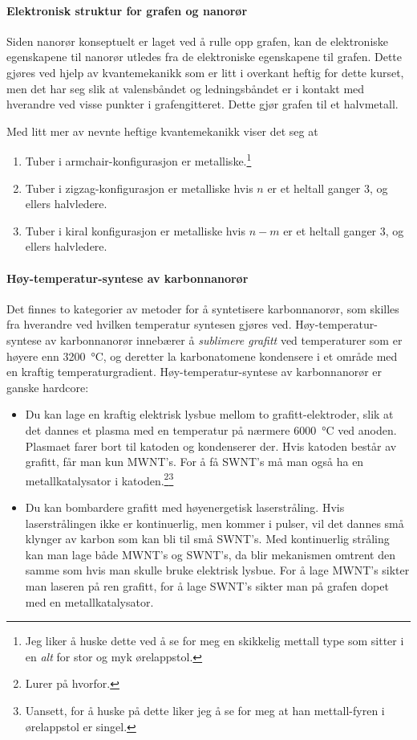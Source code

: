 
\paragraph{Elektronisk struktur for grafen og nanorør} Siden nanorør konseptuelt er laget ved å rulle opp grafen, kan de elektroniske egenskapene til nanorør utledes fra de elektroniske egenskapene til grafen. Dette gjøres ved hjelp av kvantemekanikk som er litt i overkant heftig for dette kurset, men det har seg slik at valensbåndet og ledningsbåndet er i kontakt med hverandre ved visse punkter i grafengitteret. Dette gjør grafen til et halvmetall.

Med litt mer av nevnte heftige kvantemekanikk viser det seg at
\begin{enumerate}
	\item Tuber i armchair-konfigurasjon er metalliske.\footnote{Jeg liker å huske dette ved å se for meg en skikkelig mettall type som sitter i en \emph{alt} for stor og myk ørelappstol.}
	\item Tuber i zigzag-konfigurasjon er metalliske hvis $n$ er et heltall ganger 3, og ellers halvledere.
	\item Tuber i kiral konfigurasjon er metalliske hvis $n-m$ er et heltall ganger 3, og ellers halvledere.
\end{enumerate}

\paragraph{Høy-temperatur-syntese av karbonnanorør} Det finnes to kategorier av metoder for å syntetisere karbonnanorør, som skilles fra hverandre ved hvilken temperatur syntesen gjøres ved. Høy-temperatur-syntese av karbonnanorør innebærer å \emph{sublimere grafitt} ved temperaturer som er høyere enn \SI{3200}{\celsius}, og deretter la karbonatomene kondensere i et område med en kraftig temperaturgradient. Høy-temperatur-syntese av karbonnanorør er ganske hardcore:
\begin{itemize}
	\item Du kan lage en kraftig elektrisk lysbue mellom to grafitt-elektroder, slik at det dannes et plasma med en temperatur på nærmere \SI{6000}{\celsius} ved anoden. Plasmaet farer bort til katoden og kondenserer der. Hvis katoden består av grafitt, får man kun MWNT's. For å få SWNT's må man også ha en metallkatalysator i katoden.\footnote{Lurer på hvorfor.}\footnote{Uansett, for å huske på dette liker jeg å se for meg at han mettall-fyren i ørelappstol er singel.}
	\item Du kan bombardere grafitt med høyenergetisk laserstråling. Hvis laserstrålingen ikke er kontinuerlig, men kommer i pulser, vil det dannes små klynger av karbon som kan bli til små SWNT's. Med kontinuerlig stråling kan man lage både MWNT's og SWNT's, da blir mekanismen omtrent den samme som hvis man skulle bruke elektrisk lysbue. For å lage MWNT's sikter man laseren på ren grafitt, for å lage SWNT's sikter man på grafen dopet med en metallkatalysator.
\end{itemize}
\vfill
